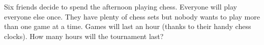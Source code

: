 \documentclass{book}
\begin{document}
\setcounter{project}{47}
\addtocounter{project}{-1}
\begin{activity}[]\label{activity-40}
\hypertarget{p-428}{}%
Six friends decide to spend the afternoon playing chess. Everyone will play everyone else once. They have plenty of chess sets but nobody wants to play more than one game at a time. Games will last an hour (thanks to their handy chess clocks). How many hours will the tournament last?%
\end{activity}
\end{document}
